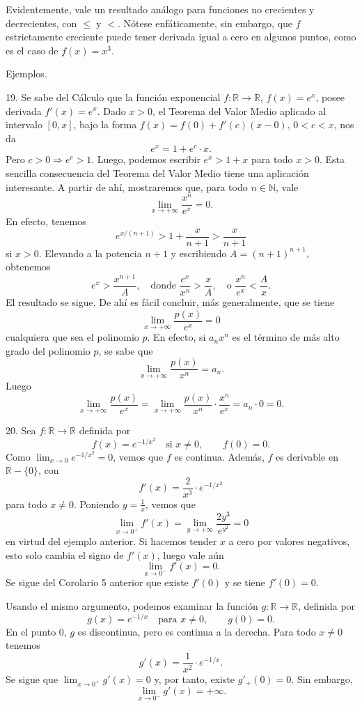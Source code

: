 \documentclass[12pt,oneside]{book}
\begin{document}
Evidentemente, vale un resultado análogo para funciones no crecientes y decrecientes, con \( \leq \) y \( < \). Nótese enfáticamente, sin embargo, que \( f \) estrictamente creciente puede tener derivada igual a cero en algunos puntos, como es el caso de \( f(x) = x^3 \).

Ejemplos.

19. Se sabe del Cálculo que la función exponencial \( f: \mathbb{R} \to \mathbb{R} \), \( f(x) = e^x \), posee derivada \( f'(x) = e^x \). Dado \( x > 0 \), el Teorema del Valor Medio aplicado al intervalo \( [0, x] \), bajo la forma \( f(x) = f(0) + f'(c)(x - 0) \), \( 0 < c < x \), nos da
\[
e^x = 1 + e^c \cdot x.
\]
Pero \( c > 0 \Rightarrow e^c > 1 \). Luego, podemos escribir \( e^x > 1 + x \) para todo \( x > 0 \). Esta sencilla consecuencia del Teorema del Valor Medio tiene una aplicación interesante. A partir de ahí, mostraremos que, para todo \( n \in \mathbb{N} \), vale
\[
\lim_{x \to +\infty} \frac{x^n}{e^x} = 0.
\]
En efecto, tenemos
\[
e^{x/(n+1)} > 1 + \frac{x}{n+1} > \frac{x}{n+1}
\]
si \( x > 0 \). Elevando a la potencia \( n+1 \) y escribiendo \( A = (n+1)^{n+1} \), obtenemos
\[
e^x > \frac{x^{n+1}}{A}, \quad \text{donde } \frac{e^x}{x^n} > \frac{x}{A}, \quad \text{o } \frac{x^n}{e^x} < \frac{A}{x}.
\]
El resultado se sigue. De ahí es fácil concluir, más generalmente, que se tiene
\[
\lim_{x \to +\infty} \frac{p(x)}{e^x} = 0
\]
cualquiera que sea el polinomio \( p \). En efecto, si \( a_n x^n \) es el término de más alto grado del polinomio \( p \), se sabe que
\[
\lim_{x \to +\infty} \frac{p(x)}{x^n} = a_n.
\]
Luego
\[
\lim_{x \to +\infty} \frac{p(x)}{e^x}
= \lim_{x \to +\infty} \frac{p(x)}{x^n} \cdot \frac{x^n}{e^x}
= a_n \cdot 0 = 0.
\]

20. Sea \( f: \mathbb{R} \to \mathbb{R} \) definida por
\[
f(x) = e^{-1/x^2} \quad \text{si } x \neq 0, \qquad f(0) = 0.
\]
Como \( \lim_{x \to 0} e^{-1/x^2} = 0 \), vemos que \( f \) es continua. Además, \( f \) es derivable en \( \mathbb{R} - \{0\} \), con
\[
f'(x) = \frac{2}{x^3} \cdot e^{-1/x^2}
\]
para todo \( x \neq 0 \). Poniendo \( y = \frac{1}{x} \), vemos que
\[
\lim_{x \to 0^+} f'(x) = \lim_{y \to +\infty} \frac{2y^3}{e^{y^2}} = 0
\]
en virtud del ejemplo anterior. Si hacemos tender \( x \) a cero por valores negativos, esto solo cambia el signo de \( f'(x) \), luego vale aún
\[
\lim_{x \to 0^-} f'(x) = 0.
\]
Se sigue del Corolario 5 anterior que existe \( f'(0) \) y se tiene \( f'(0) = 0 \).

Usando el mismo argumento, podemos examinar la función \( g: \mathbb{R} \to \mathbb{R} \), definida por
\[
g(x) = e^{-1/x} \quad \text{para } x \neq 0, \qquad g(0) = 0.
\]
En el punto \( 0 \), \( g \) es discontinua, pero es continua a la derecha. Para todo \( x \neq 0 \) tenemos
\[
g'(x) = \frac{1}{x^2} \cdot e^{-1/x}.
\]
Se sigue que \( \lim_{x \to 0^+} g'(x) = 0 \) y, por tanto, existe \( g'_+(0) = 0 \). Sin embargo,
\[
\lim_{x \to 0^-} g'(x) = +\infty.
\]
\end{document}
